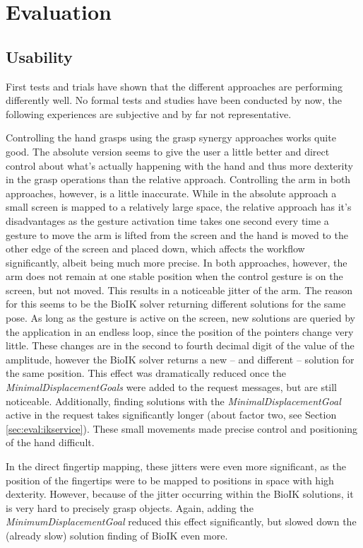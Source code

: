 \chapter{Evaluation}
\label{chap:eval}

\section{Usability}

First tests and trials have shown that the different approaches are performing differently well. No formal tests and studies have been conducted by now, the following experiences are subjective and by far not representative.

Controlling the hand grasps using the grasp synergy approaches works quite good. The absolute version seems to give the user a little better and direct control about what's actually happening with the hand and thus more dexterity in the grasp operations than the relative approach. Controlling the arm in both approaches, however, is a little inaccurate. While in the absolute approach a small screen is mapped to a relatively large space, the relative approach has it's disadvantages as the gesture activation time takes one second every time a gesture to move the arm is lifted from the screen and the hand is moved to the other edge of the screen and placed down, which affects the workflow significantly, albeit being much more precise. In both approaches, however, the arm does not remain at one stable position when the control gesture is on the screen, but not moved. This results in a noticeable jitter of the arm. The reason for this seems to be the BioIK solver returning different solutions for the same pose. As long as the gesture is active on the screen, new solutions are queried by the application in an endless loop, since the position of the pointers change very little. These changes are in the second to fourth decimal digit of the value of the amplitude, however the BioIK solver returns a new -- and different -- solution for the same position. This effect was dramatically reduced once the \textit{MinimalDisplacementGoals} were added to the request messages, but are still noticeable. Additionally, finding solutions with the \textit{MinimalDisplacementGoal} active in the request takes significantly longer (about factor two, see Section \ref{sec:eval:ikservice}).  These small movements made precise control and positioning of the hand difficult. 

In the direct fingertip mapping, these jitters were even more significant, as the position of the fingertips were to be mapped to positions in space with high dexterity. However, because of the jitter occurring within the BioIK solutions, it is very hard to precisely grasp objects. Again, adding the \textit{MinimumDisplacementGoal} reduced this effect significantly, but slowed down the (already slow) solution finding of BioIK even more.

